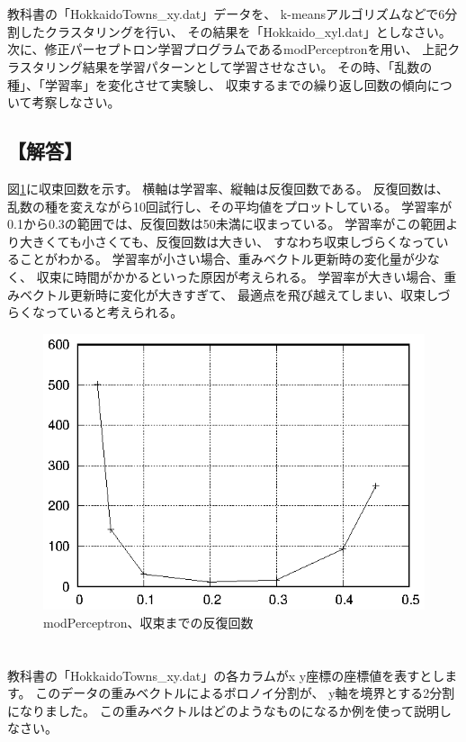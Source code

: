 \documentclass[a4j]{jarticle}
\begin{document}
\section{}
教科書の「HokkaidoTowns\_xy\@.dat」データを、
k-meansアルゴリズムなどで6分割したクラスタリングを行い、
その結果を「Hokkaido\_xyl\@.dat」としなさい。
次に、修正パーセプトロン学習プログラムであるmodPerceptronを用い、
上記クラスタリング結果を学習パターンとして学習させなさい。
その時、「乱数の種」、「学習率」を変化させて実験し、
収束するまでの繰り返し回数の傾向について考察しなさい。

\subsection{【解答】}
図\ref{fig:modPerceptron}に収束回数を示す。
横軸は学習率、縦軸は反復回数である。
反復回数は、乱数の種を変えながら10回試行し、その平均値をプロットしている。
学習率が0.1から0.3の範囲では、反復回数は50未満に収まっている。
学習率がこの範囲より大きくても小さくても、反復回数は大きい、
すなわち収束しづらくなっていることがわかる。
学習率が小さい場合、重みベクトル更新時の変化量が少なく、
収束に時間がかかるといった原因が考えられる。
学習率が大きい場合、重みベクトル更新時に変化が大きすぎて、
最適点を飛び越えてしまい、収束しづらくなっていると考えられる。

\begin{figure}[tbp]
 \begin{center}
  \includegraphics[width=0.5\hsize]{fig/modPerceptron.eps}
 \end{center}
 \caption{modPerceptron、収束までの反復回数}
 \label{fig:modPerceptron}
\end{figure}


\section{}
教科書の「HokkaidoTowns\_xy\@.dat」の各カラムがx y座標の座標値を表すとします。
このデータの重みベクトルによるボロノイ分割が、
y軸を境界とする2分割になりました。
この重みベクトルはどのようなものになるか例を使って説明しなさい。
\end{document}
